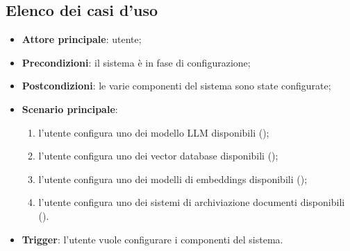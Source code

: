 \documentclass[10pt, a4paper]{article}
\begin{document}
\newpage
\subsection{Elenco dei casi d'uso}

    \begin{itemize}
        \item \textbf{Attore principale}: utente;
        \item \textbf{Precondizioni}: il sistema è in fase di configurazione;
        \item \textbf{Postcondizioni}: le varie componenti del sistema sono state configurate;
        \item \textbf{Scenario principale}:
            \begin{enumerate}
                \item l'utente configura uno dei modello LLM disponibili ();
                \item l'utente configura uno dei vector database disponibili ();
                \item l'utente configura uno dei modelli di embeddings disponibili ();
                \item l'utente configura uno dei sistemi di archiviazione documenti disponibili ().
            \end{enumerate}
        \item \textbf{Trigger}: l’utente vuole configurare i componenti del sistema.
    \end{itemize}

    
\end{document}
